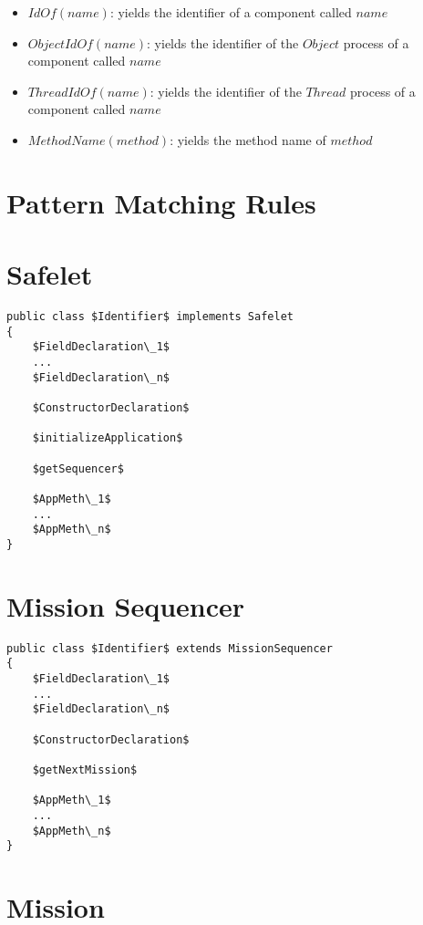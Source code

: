 \documentclass[11pt,a4paper]{article}
\begin{document}
\begin{itemize}
\item $IdOf(name)$: yields the identifier of a component called $name$
\item $ObjectIdOf(name)$: yields the identifier of the $Object$ process of a component called $name$
\item $ThreadIdOf(name)$: yields the identifier of the $Thread$ process of a component called $name$
\item $MethodName(method)$: yields the method name of $method$
\end{itemize}
\newpage
\section*{Pattern Matching Rules}

\section*{Safelet}
\begin{lstlisting}
public class $Identifier$ implements Safelet
{
	$FieldDeclaration\_1$
	...
	$FieldDeclaration\_n$

	$ConstructorDeclaration$

	$initializeApplication$

	$getSequencer$

	$AppMeth\_1$
	...
	$AppMeth\_n$
}
\end{lstlisting}



\newpage

\section*{Mission Sequencer}

\begin{lstlisting}
public class $Identifier$ extends MissionSequencer
{
	$FieldDeclaration\_1$
	...
	$FieldDeclaration\_n$

	$ConstructorDeclaration$

	$getNextMission$

	$AppMeth\_1$
	...
	$AppMeth\_n$
}
\end{lstlisting}



\newpage

\section*{Mission}
\end{document}
